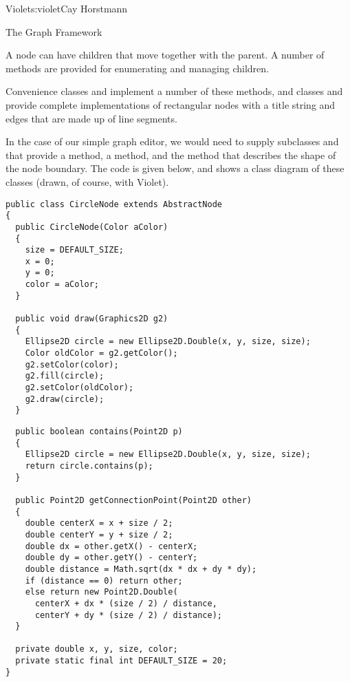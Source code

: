 \begin{aosachapter}{Violet}{s:violet}{Cay Horstmann}
\begin{aosasect1}{The Graph Framework}
\begin{aosaitemize}
\item A node can have children that move together with the parent. A number
  of methods are provided for enumerating and managing children.

\end{aosaitemize}


Convenience classes  and 
implement a number of these methods, and classes
 and  provide complete
implementations of rectangular nodes with a title string and edges
that are made up of line segments.

In the case of our simple graph editor, we would need to supply
subclasses  and  that provide a
 method, a  method, and the
 method that describes the shape of the node
boundary.
The code is given below,
and  shows a class diagram of these classes
(drawn, of course, with Violet).

\begin{verbatim}
public class CircleNode extends AbstractNode
{
  public CircleNode(Color aColor)
  {
    size = DEFAULT_SIZE;
    x = 0;
    y = 0;
    color = aColor;
  }

  public void draw(Graphics2D g2)
  {
    Ellipse2D circle = new Ellipse2D.Double(x, y, size, size);
    Color oldColor = g2.getColor();
    g2.setColor(color);
    g2.fill(circle);
    g2.setColor(oldColor);
    g2.draw(circle);
  }
\end{verbatim}

\begin{verbatim}
  public boolean contains(Point2D p)
  {
    Ellipse2D circle = new Ellipse2D.Double(x, y, size, size);
    return circle.contains(p);
  }

  public Point2D getConnectionPoint(Point2D other)
  {
    double centerX = x + size / 2;
    double centerY = y + size / 2;
    double dx = other.getX() - centerX;
    double dy = other.getY() - centerY;
    double distance = Math.sqrt(dx * dx + dy * dy);
    if (distance == 0) return other;
    else return new Point2D.Double(
      centerX + dx * (size / 2) / distance,
      centerY + dy * (size / 2) / distance);
  }

  private double x, y, size, color;
  private static final int DEFAULT_SIZE = 20;
}


\end{verbatim}
\end{aosasect1}
\end{aosachapter}
